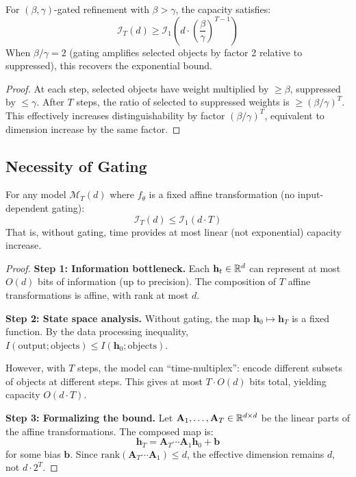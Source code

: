 \begin{theorem}
\label{thm:imperfect}
For $(\beta, \gamma)$-gated refinement with $\beta > \gamma$, the capacity satisfies:
\begin{equation}
\mathcal{I}_T(d) \geq \mathcal{I}_1\left(d \cdot \left(\frac{\beta}{\gamma}\right)^{T-1}\right)
\end{equation}
When $\beta/\gamma = 2$ (gating amplifies selected objects by factor 2 relative to suppressed), this recovers the exponential bound.
\end{theorem}

\begin{proof}
At each step, selected objects have weight multiplied by $\geq \beta$, suppressed by $\leq \gamma$. After $T$ steps, the ratio of selected to suppressed weights is $\geq (\beta/\gamma)^T$. This effectively increases distinguishability by factor $(\beta/\gamma)^T$, equivalent to dimension increase by the same factor.
\end{proof}

\subsection{Necessity of Gating}

\begin{theorem}
\label{thm:linear_lower}
For any model $\mathcal{M}_T(d)$ where $f_\theta$ is a fixed affine transformation (no input-dependent gating):
\begin{equation}
\mathcal{I}_T(d) \leq \mathcal{I}_1(d \cdot T)
\end{equation}
That is, without gating, time provides at most linear (not exponential) capacity increase.
\end{theorem}

\begin{proof}
\textbf{Step 1: Information bottleneck.}
Each $\mathbf{h}_t \in \mathbb{R}^d$ can represent at most $O(d)$ bits of information (up to precision). The composition of $T$ affine transformations is affine, with rank at most $d$.

\textbf{Step 2: State space analysis.}
Without gating, the map $\mathbf{h}_0 \mapsto \mathbf{h}_T$ is a fixed function. By the data processing inequality, $I(\text{output}; \text{objects}) \leq I(\mathbf{h}_0; \text{objects})$.

However, with $T$ steps, the model can ``time-multiplex'': encode different subsets of objects at different steps. This gives at most $T \cdot O(d)$ bits total, yielding capacity $O(d \cdot T)$.

\textbf{Step 3: Formalizing the bound.}
Let $\mathbf{A}_1, \ldots, \mathbf{A}_T \in \mathbb{R}^{d \times d}$ be the linear parts of the affine transformations. The composed map is:
\begin{equation}
\mathbf{h}_T = \mathbf{A}_T \cdots \mathbf{A}_1 \mathbf{h}_0 + \mathbf{b}
\end{equation}
for some bias $\mathbf{b}$. Since $\text{rank}(\mathbf{A}_T \cdots \mathbf{A}_1) \leq d$, the effective dimension remains $d$, not $d \cdot 2^T$.
\end{proof}

